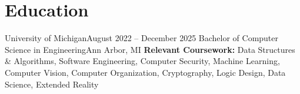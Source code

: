 \section{Education}
\resumeSubHeadingListStart

    \resumeSubheading
    {University of Michigan}{August 2022 -- December 2025}
    {Bachelor of Computer Science in Engineering}{Ann Arbor, MI}
    \resumeItemListStart
        \small{{\vspace{8pt}}\textbf{Relevant Coursework:}  Data Structures \& Algorithms, Software Engineering, Computer Security, Machine Learning, Computer Vision, Computer Organization, Cryptography, Logic Design, Data Science, Extended Reality}
    \resumeItemListEnd

\resumeSubHeadingListEnd
